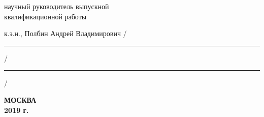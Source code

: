 \hfill{}

\noindent
научный руководитель выпускной \\
квалификационной работы

\noindent
к.э.н., Полбин Андрей Владимирович
\hfill /\rule{6em}{0.5pt}/\rule{6em}{0.5pt}/

\hfill{}

%
%

\vfill

\begin{center}
\normalsize \bfseries МОСКВА \\ 2019 г.
\end{center}
\endgroup